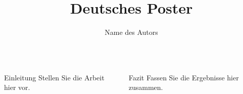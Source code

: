 \documentclass{beamer}
\title{Deutsches Poster}
\author{Name des Autors}
\begin{document}
\begin{frame}
\begin{columns}[t]
  \begin{block}{Einleitung}
    Stellen Sie die Arbeit hier vor.
  \end{block}
  \begin{block}{Fazit}
    Fassen Sie die Ergebnisse hier zusammen.
  \end{block}
\end{columns}
\end{frame}
\end{document}
